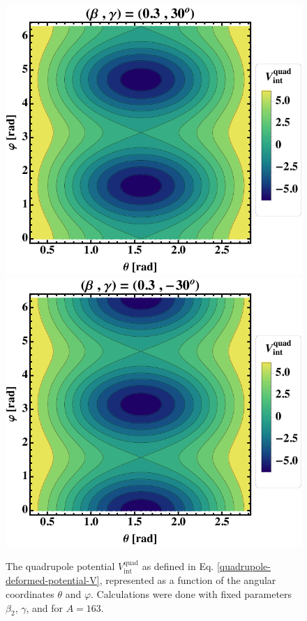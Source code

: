 \begin{figure}
    \centering
    \includegraphics[scale=0.66]{Chapters/Figures/quadrupole-potentialV-3.pdf}
    \includegraphics[scale=0.66]{Chapters/Figures/quadrupole-potentialV-4.pdf}
    \caption{The quadrupole potential $V_\text{int}^\text{quad}$ as defined in Eq. \ref{quadrupole-deformed-potential-V}, represented as a function of the angular coordinates $\theta$ and $\varphi$. Calculations were done with fixed parameters $\beta_2$, $\gamma$, and for $A=163$.}
    \label{figs-deformed-quadrupole-potential-2}
\end{figure}

